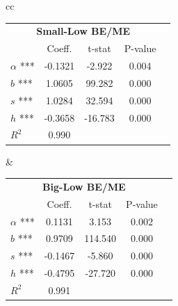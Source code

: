 \hfill
\begin{center}
\begin{tabular}{cc}	
\begin{tabular}{lcccc}
	\toprule
	
	\multicolumn{4}{c}{\textbf{Small-Low BE/ME} } & \\
	& Coeff. & t-stat & P-value &\\
	$\alpha$ ***& 	-0.1321	& -2.922 & 0.004 &\\
	$b$ ***& 1.0605 & 99.282& 0.000 &\\
	$s$ ***& 1.0284& 32.594 & 0.000 &\\
	$h$ ***&  -0.3658& -16.783 & 0.000 & \\
	
	$R^2$ & 0.990 & & & \\
	\hline			
\end{tabular} & \begin{tabular}{lcccc}
\toprule

\multicolumn{4}{c}{\textbf{Big-Low BE/ME} } & \\
& Coeff. & t-stat & P-value &\\
$\alpha$ *** & 	0.1131	& 3.153 & 0.002 &\\
$b$ *** & 0.9709 & 114.540& 0.000 &\\
$s$ ***  & -0.1467& -5.860 & 0.000 &\\
$h$ *** &  -0.4795& -27.720 & 0.000 & \\

$R^2$ & 0.991 & & & \\
\hline	 
\end{tabular} 
\end{tabular}	
\end{center}

